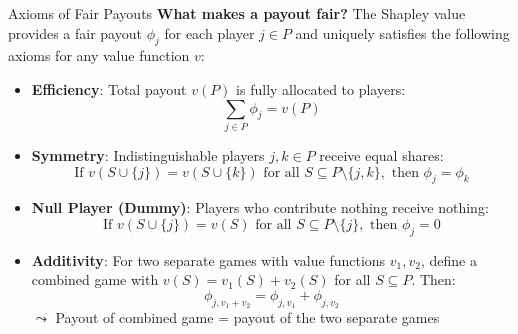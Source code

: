 \documentclass[10pt,compress,t,notes=noshow, xcolor=table]{beamer}
\begin{document}
\begin{frame}{Axioms of Fair Payouts}
\textbf{What makes a payout fair?} The Shapley value provides a fair payout $\phi_j$ for each player \( j \in P \) and uniquely satisfies the following axioms for any value function \( v\):

\medskip

\begin{itemize}[<+->]
  \item \textbf{Efficiency}: Total payout $v(P)$ is fully allocated to players:
  \[
  \textstyle \sum_{j \in P} \phi_j = v(P)
  \]

  \item \textbf{Symmetry}: Indistinguishable players $j,k \in P$ receive equal shares:
  \[
  \text{If } v(S \cup \{j\}) = v(S \cup \{k\}) \text{ for all } S \subseteq P \setminus \{j,k\}, \text{ then } \phi_j = \phi_k
  \]

  \item \textbf{Null Player (Dummy)}: Players who contribute nothing receive nothing:
  \[
  \text{If } v(S \cup \{j\}) = v(S) \text{ for all } S \subseteq P \setminus \{j\}, \text{ then } \phi_j = 0
  \]

  \item \textbf{Additivity}: For two separate games with value functions \( v_1, v_2 \), define a combined game with \( v(S) = v_1(S) + v_2(S) \) for all \( S \subseteq P \). Then:
  \[
  \phi_{j, v_1 + v_2} = \phi_{j, v_1} + \phi_{j, v_2}\]
  $\leadsto$ Payout of combined game = payout of the two separate games
\end{itemize}
\end{frame}
\end{document}
